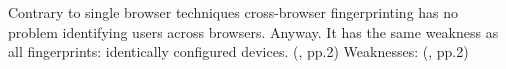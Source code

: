 Contrary to single browser techniques cross-browser fingerprinting has no problem identifying users across browsers. Anyway. It has the same weakness as all fingerprints: identically configured devices. (\textcite{upi15}, pp.2)
Weaknesses: (\textcite{upi15}, pp.2)

